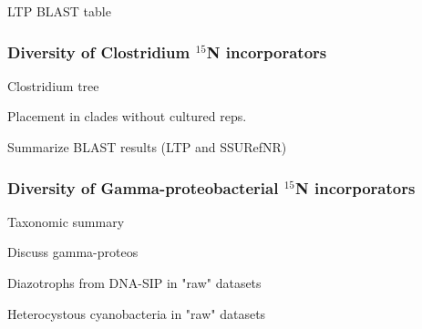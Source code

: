 LTP BLAST table

\subsubsection{Diversity of Clostridium $^{15}$N incorporators}

Clostridium tree

Placement in clades without cultured reps.

Summarize BLAST results (LTP and SSURefNR)

\subsubsection{Diversity of Gamma-proteobacterial $^{15}$N incorporators}

Taxonomic summary

Discuss gamma-proteos

Diazotrophs from DNA-SIP in "raw" datasets

Heterocystous cyanobacteria in "raw" datasets



